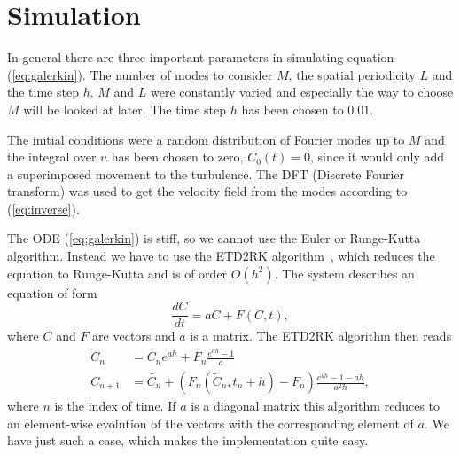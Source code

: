 \section{Simulation}
In general there are three important parameters in simulating equation (\ref{eq:galerkin}). The number of modes to consider $M$, the spatial periodicity $L$ and the time step $h$. $M$ and $L$ were constantly varied and especially the way to choose $M$ will be looked at later. The time step $h$ has been chosen to $0.01$.

The initial conditions were a random distribution of Fourier modes up to $M$ and the integral over $u$ has been chosen to zero, $C_0(t) = 0$, since it would only add a superimposed movement to the turbulence. The DFT (Discrete Fourier transform) was used to get the velocity field from the modes according to (\ref{eq:inverse}).

The ODE (\ref{eq:galerkin}) is stiff, so we cannot use the Euler or Runge-Kutta algorithm. Instead we have to use the ETD2RK algorithm~\cite{cox2002exponential}, which reduces the equation to Runge-Kutta and is of order $O(h^2)$. The system describes an equation of form
\begin{equation}
  \frac{d C}{dt} = aC + F(C,t),
\end{equation}
where $C$ and $F$ are vectors and $a$ is a matrix. The ETD2RK algorithm then reads
\begin{align}
  \tilde{C}_n & = C_{n} e^{ah} + F_{n} \frac{e^{ah} - 1}{a} \\
  C_{n+1} & = \tilde{C_n} + \left(F_n(\tilde{C}_n, t_n + h) - F_n \right) \frac{e^{ah} - 1 - ah}{a^2 h},
\end{align}
where $n$ is the index of time. If $a$ is a diagonal matrix this algorithm reduces to an element-wise evolution of the vectors with the corresponding element of $a$. We have just such a case, which makes the implementation quite easy.
